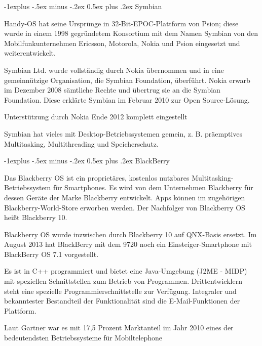\documentclass[a4paper, 8pt]{article}
\makeatletter
\renewcommand{\subsection}{\@startsection{subsection}{2}{0mm}%
                                {-1explus -.5ex minus -.2ex}%
                                {0.5ex plus .2ex}%
                                {\normalfont\normalsize\bfseries}}
\makeatother
\begin{document}
\begin{multicols*}{2}
  \subsection{Symbian}
  \begin{itemize*}
    \item Handy-OS hat seine Ursprünge in 32-Bit-EPOC-Plattform von Psion; diese wurde in einem 1998 gegründetem Konsortium mit dem Namen Symbian von den Mobilfunkunternehmen Ericsson, Motorola, Nokia und Psion eingesetzt und weiterentwickelt.
    \item Symbian Ltd. wurde vollständig durch Nokia übernommen und in eine gemeinnützige Organisation, die Symbian Foundation, überführt. Nokia erwarb im Dezember 2008 sämtliche Rechte und übertrug sie an die Symbian Foundation. Diese erklärte Symbian im Februar 2010 zur Open Source-Lösung.
    \item Unterstützung durch Nokia Ende 2012 komplett eingestellt
    \item Symbian hat vieles mit Desktop-Betriebssystemen gemein, z. B. präemptives Multitasking, Multithreading und Speicherschutz.
  \end{itemize*}

  \subsection{BlackBerry}
  \begin{itemize*}
    \item Das Blackberry OS ist ein proprietäres, kostenlos nutzbares Multitasking-Betriebssystem für Smartphones. Es wird von dem Unternehmen Blackberry für dessen Geräte der Marke Blackberry entwickelt. Apps können im zugehörigen Blackberry-World-Store erworben werden. Der Nachfolger von Blackberry OS heißt Blackberry 10.
    \item Blackberry OS wurde inzwischen durch Blackberry 10 auf QNX-Basis ersetzt. Im August 2013 hat BlackBerry mit dem 9720 noch ein Einsteiger-Smartphone mit BlackBerry OS 7.1 vorgestellt.
    \item Es ist in C++ programmiert und bietet eine Java-Umgebung (J2ME - MIDP) mit speziellen Schnittstellen zum Betrieb von Programmen. Drittentwicklern steht eine spezielle Programmierschnittstelle zur Verfügung. Integraler und bekanntester Bestandteil der Funktionalität sind die E-Mail-Funktionen der Plattform.
    \item Laut Gartner war es mit 17,5 Prozent Marktanteil im Jahr 2010 eines der bedeutendsten Betriebssysteme für Mobiltelephone
  \end{itemize*}


\end{multicols*}
\end{document}

